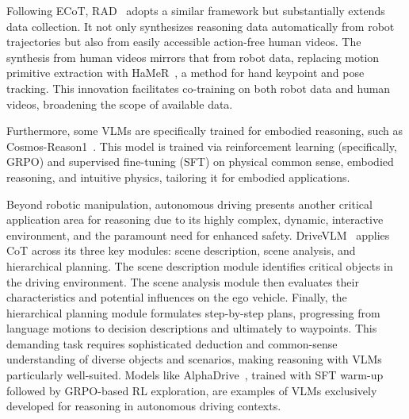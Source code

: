 \documentclass[10pt, a4paper, logo, copyright]{googledeepmind} %
\begin{document}
Following ECoT, RAD~\cite{clark2025action} adopts a similar framework but substantially extends data collection. It not only synthesizes reasoning data automatically from robot trajectories but also from easily accessible action-free human videos. The synthesis from human videos mirrors that from robot data, replacing motion primitive extraction with HaMeR~\cite{pavlakos2024reconstructing}, a method for hand keypoint and pose tracking. This innovation facilitates co-training on both robot data and human videos, broadening the scope of available data.

Furthermore, some VLMs are specifically trained for embodied reasoning, such as Cosmos-Reason1~\cite{nvidia2025cosmos}. This model is trained via reinforcement learning (specifically, GRPO) and supervised fine-tuning (SFT) on physical common sense, embodied reasoning, and intuitive physics, tailoring it for embodied applications.

Beyond robotic manipulation, autonomous driving presents another critical application area for reasoning due to its highly complex, dynamic, interactive environment, and the paramount need for enhanced safety. DriveVLM~\cite{tian2024drivevlm} applies CoT across its three key modules: scene description, scene analysis, and hierarchical planning. The scene description module identifies critical objects in the driving environment. The scene analysis module then evaluates their characteristics and potential influences on the ego vehicle. Finally, the hierarchical planning module formulates step-by-step plans, progressing from language motions to decision descriptions and ultimately to waypoints. This demanding task requires sophisticated deduction and common-sense understanding of diverse objects and scenarios, making reasoning with VLMs particularly well-suited. Models like AlphaDrive~\cite{bo2025alpha}, trained with SFT warm-up followed by GRPO-based RL exploration, are examples of VLMs exclusively developed for reasoning in autonomous driving contexts.
\end{document}
